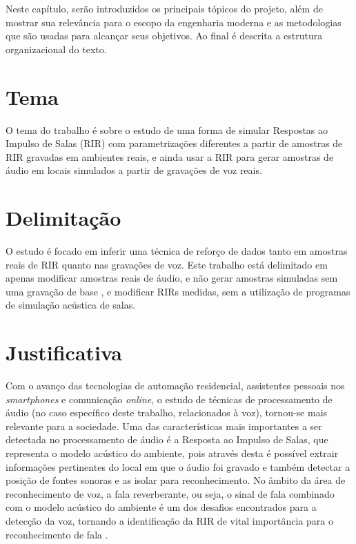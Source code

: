 Neste capítulo, serão introduzidos os principais tópicos do projeto, além de mostrar sua relevância para o escopo da engenharia moderna
e as metodologias que são usadas para alcançar seus objetivos. Ao final é descrita a estrutura organizacional do texto.

\section{Tema}

O tema do trabalho é sobre o estudo de uma forma de simular Respostas ao Impulso de Salas (RIR) com parametrizações diferentes a partir de amostras 
de RIR gravadas em ambientes reais, e ainda usar a RIR para gerar amostras de áudio em locais simulados a partir de gravações de voz reais.

\section{Delimitação}

O estudo é focado em inferir uma técnica de reforço de dados tanto em amostras reais de RIR quanto nas gravações de voz. 
Este trabalho está delimitado em apenas modificar amostras reais de áudio, e não gerar amostras simuladas sem uma gravação de base
, e modificar RIRs medidas, sem a utilização de programas de simulação acústica de salas.

\section{Justificativa}

Com o avanço das tecnologias de automação residencial, assistentes pessoais nos \textit{smartphones} e comunicação \textit{online}, o estudo de técnicas de
processamento de áudio (no caso específico deste trabalho, relacionados à voz), tornou-se mais relevante para a sociedade.
Uma das características mais importantes a ser detectada no processamento de áudio é a Resposta ao Impulso de Salas, 
que representa o modelo acústico do ambiente, pois através desta é possível extrair informações pertinentes do local em que o áudio foi gravado
e também detectar a posição de fontes sonoras e as isolar para reconhecimento.
No âmbito da área de reconhecimento de voz, a fala reverberante, ou seja, o sinal de fala combinado com o modelo acústico do ambiente
é um dos desafios encontrados para a detecção da voz, tornando a identificação da RIR de vital importância para o reconhecimento de fala \cite{FAR-FIELD_ASR}.

